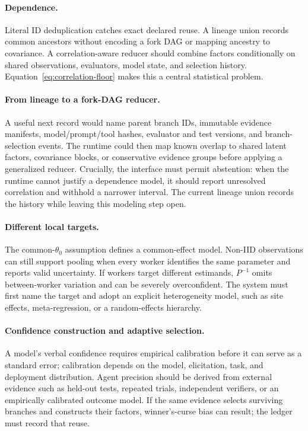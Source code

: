 \paragraph{Dependence.}
Literal ID deduplication catches exact declared reuse. A lineage union records common ancestors
without encoding a fork DAG or mapping ancestry to covariance. A correlation-aware
reducer should combine factors conditionally on shared observations, evaluators, model state,
and selection history. Equation~\eqref{eq:correlation-floor} makes this a central statistical
problem.

\paragraph{From lineage to a fork-DAG reducer.}
A useful next record would name parent branch IDs, immutable evidence manifests, model/prompt/tool
hashes, evaluator and test versions, and branch-selection events. The runtime could then map
known overlap to shared latent factors, covariance blocks, or conservative evidence groups
before applying a generalized reducer. Crucially, the interface must permit abstention: when the
runtime cannot justify a dependence model, it should report unresolved correlation and withhold
a narrower interval. The current lineage union records the history while leaving this modeling
step open.

\paragraph{Different local targets.}
The common-$\theta_0$ assumption defines a common-effect model. Non-IID observations can still
support pooling when every worker identifies the same parameter and reports valid uncertainty.
If workers target different estimands, $P^{-1}$ omits between-worker variation and
can be severely overconfident. The system must first name the target and adopt an explicit
heterogeneity model, such as site effects, meta-regression, or a random-effects hierarchy.

\paragraph{Confidence construction and adaptive selection.}
A model's verbal confidence requires empirical calibration before it can serve as a standard
error; calibration depends on the model, elicitation, task, and deployment distribution. Agent
precision should be derived from external evidence such as held-out tests, repeated trials,
independent verifiers, or an empirically calibrated outcome model. If the same evidence selects
surviving branches and constructs their factors, winner's-curse bias can result; the ledger must
record that reuse.

